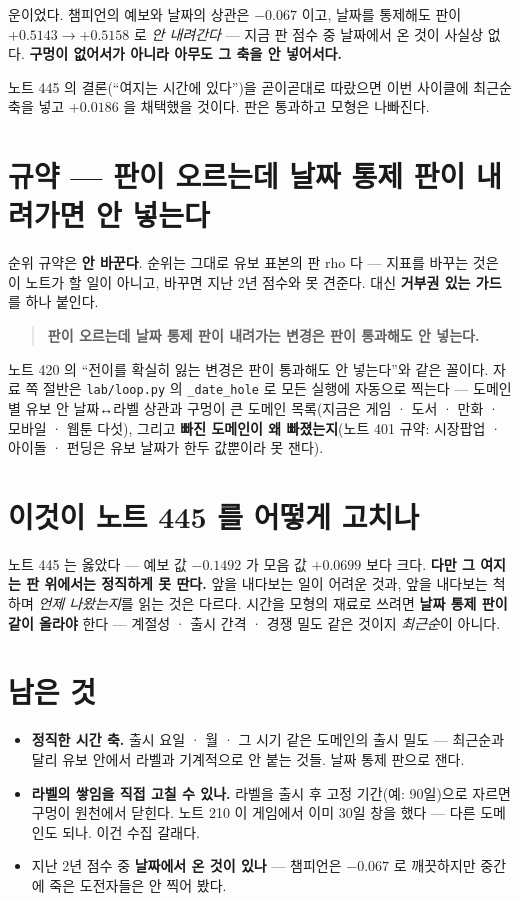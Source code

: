 \documentclass[11pt]{article}
\begin{document}
운이었다. 챔피언의 예보와 날짜의 상관은 $-0.067$ 이고, 날짜를 통제해도
판이 $+0.5143 \to +0.5158$ 로 \emph{안 내려간다} --- 지금 판 점수 중
날짜에서 온 것이 사실상 없다. \textbf{구멍이 없어서가 아니라 아무도 그
축을 안 넣어서다.}

노트 445 의 결론(``여지는 시간에 있다'')을 곧이곧대로 따랐으면 이번
사이클에 최근순 축을 넣고 $+0.0186$ 을 채택했을 것이다. 판은 통과하고
모형은 나빠진다.

\section{규약 --- 판이 오르는데 날짜 통제 판이 내려가면 안 넣는다}

순위 규약은 \textbf{안 바꾼다}. 순위는 그대로 유보 표본의 판 rho 다 ---
지표를 바꾸는 것은 이 노트가 할 일이 아니고, 바꾸면 지난 2년 점수와
못 견준다. 대신 \textbf{거부권 있는 가드}를 하나 붙인다.

\begin{quote}
\textbf{판이 오르는데 날짜 통제 판이 내려가는 변경은 판이 통과해도 안
넣는다.}
\end{quote}

노트 420 의 ``전이를 확실히 잃는 변경은 판이 통과해도 안 넣는다''와 같은
꼴이다. 자료 쪽 절반은 \texttt{lab/loop.py} 의 \texttt{\_date\_hole} 로
모든 실행에 자동으로 찍는다 --- 도메인별 유보 안 날짜↔라벨 상관과 구멍이
큰 도메인 목록(지금은 게임 · 도서 · 만화 · 모바일 · 웹툰 다섯), 그리고
\textbf{빠진 도메인이 왜 빠졌는지}(노트 401 규약: 시장팝업 · 아이돌 ·
펀딩은 유보 날짜가 한두 값뿐이라 못 잰다).

\section{이것이 노트 445 를 어떻게 고치나}

노트 445 는 옳았다 --- 예보 값 $-0.1492$ 가 모음 값 $+0.0699$ 보다 크다.
\textbf{다만 그 여지는 판 위에서는 정직하게 못 딴다.} 앞을 내다보는 일이
어려운 것과, 앞을 내다보는 척하며 \emph{언제 나왔는지}를 읽는 것은 다르다.
시간을 모형의 재료로 쓰려면 \textbf{날짜 통제 판이 같이 올라야} 한다 ---
계절성 · 출시 간격 · 경쟁 밀도 같은 것이지 \emph{최근순}이 아니다.

\section*{남은 것}

\begin{itemize}
\item \textbf{정직한 시간 축.} 출시 요일 · 월 · 그 시기 같은 도메인의
출시 밀도 --- 최근순과 달리 유보 안에서 라벨과 기계적으로 안 붙는 것들.
날짜 통제 판으로 잰다.
\item \textbf{라벨의 쌓임을 직접 고칠 수 있나.} 라벨을 출시 후 고정
기간(예: 90일)으로 자르면 구멍이 원천에서 닫힌다. 노트 210 이 게임에서
이미 30일 창을 했다 --- 다른 도메인도 되나. 이건 수집 갈래다.
\item 지난 2년 점수 중 \textbf{날짜에서 온 것이 있나} --- 챔피언은
$-0.067$ 로 깨끗하지만 중간에 죽은 도전자들은 안 찍어 봤다.
\end{itemize}
\end{document}
